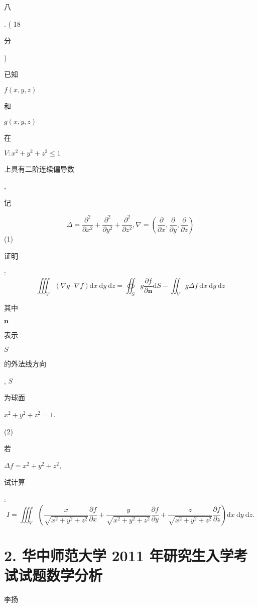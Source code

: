\documentclass[10pt]{article}
\begin{document}
\begin{CJK}{UTF8}{mj}八\end{CJK}. ( 18 \begin{CJK}{UTF8}{mj}分\end{CJK}) \begin{CJK}{UTF8}{mj}已知\end{CJK} $f(x, y, z)$ \begin{CJK}{UTF8}{mj}和\end{CJK} $g(x, y, z)$ \begin{CJK}{UTF8}{mj}在\end{CJK} $V: x^{2}+y^{2}+z^{2} \leqslant 1$ \begin{CJK}{UTF8}{mj}上具有二阶连续偏导数\end{CJK}, \begin{CJK}{UTF8}{mj}记\end{CJK}
$$
\Delta=\frac{\partial^{2}}{\partial x^{2}}+\frac{\partial^{2}}{\partial y^{2}}+\frac{\partial^{2}}{\partial z^{2}}, \nabla=\left(\frac{\partial}{\partial x}, \frac{\partial}{\partial y}, \frac{\partial}{\partial z}\right)
$$
(1) \begin{CJK}{UTF8}{mj}证明\end{CJK}:
$$
\iiint_{V}(\nabla g \cdot \nabla f) \mathrm{d} x \mathrm{~d} y \mathrm{~d} z=\oiint_{S} g \frac{\partial f}{\partial \mathbf{n}} \mathrm{d} S-\iint_{V} g \Delta f \mathrm{~d} x \mathrm{~d} y \mathrm{~d} z
$$
\begin{CJK}{UTF8}{mj}其中\end{CJK} $\mathbf{n}$ \begin{CJK}{UTF8}{mj}表示\end{CJK} $S$ \begin{CJK}{UTF8}{mj}的外法线方向\end{CJK}, $S$ \begin{CJK}{UTF8}{mj}为球面\end{CJK} $x^{2}+y^{2}+z^{2}=1$.

(2) \begin{CJK}{UTF8}{mj}若\end{CJK} $\Delta f=x^{2}+y^{2}+z^{2}$, \begin{CJK}{UTF8}{mj}试计算\end{CJK}:
$$
I=\iiint_{V}\left(\frac{x}{\sqrt{x^{2}+y^{2}+z^{2}}} \frac{\partial f}{\partial x}+\frac{y}{\sqrt{x^{2}+y^{2}+z^{2}}} \frac{\partial f}{\partial y}+\frac{z}{\sqrt{x^{2}+y^{2}+z^{2}}} \frac{\partial f}{\partial z}\right) \mathrm{d} x \mathrm{~d} y \mathrm{~d} z .
$$

\section{2. 华中师范大学 2011 年研究生入学考试试题数学分析}
\begin{CJK}{UTF8}{mj}李扬\end{CJK}
\end{document}
